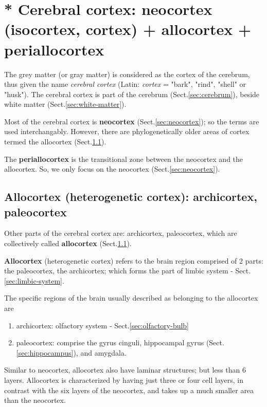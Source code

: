 \section{* Cerebral cortex: neocortex (isocortex, cortex) +
allocortex + periallocortex}
\label{sec:cerebral_cortex}
\label{sec:grey_matter}
\label{sec:periallocortex}

The grey matter (or gray matter) is considered as the cortex of the cerebrum,
thus given the name {\it cerebral cortex} (Latin: {\it cortex } = "bark",
"rind", "shell" or "husk"). The cerebral cortex is part of the cerebrum
(Sect.\ref{sec:cerebrum}), beside white matter (Sect.\ref{sec:white-matter}).

Most of the cerebral cortex is {\bf neocortex} (Sect.\ref{sec:neocortex}); so
the terms are used interchangably.  However, there are phylogenetically older
areas of cortex termed the allocortex (Sect.\ref{sec:allocortex}).

The {\bf periallocortex} is the transitional zone between the neocortex and the
allocortex. So, we only focus on the neocortex (Sect.\ref{sec:neocortex}).


\subsection{Allocortex (heterogenetic cortex): archicortex, paleocortex}
\label{sec:allocortex}

Other parts of the cerebral cortex are: archicortex,
paleocortex, which are collectively called {\bf allocortex}
(Sect.\ref{sec:allocortex}).

{\bf Allocortex} (heterogenetic cortex) refers to the brain region comprised of
2 parts: the paleocortex, the archicortex; which forms the part of limbic system
- Sect.\ref{sec:limbic-system}.

The specific regions of the brain usually described as belonging to the
allocortex are 
\begin{enumerate}
  \item  archicortex: olfactory system - Sect.\ref{sec:olfactory-bulb}
  
  \item paleocortex: comprise the gyrus cinguli, hippocampal gyrus
  (Sect.\ref{sec:hippocampus}), and amygdala.
\end{enumerate}


Similar to neocortex, allocortex also have laminar structures; but less than 6
layers. Allocortex is characterized by having just three or four cell layers, in
contrast with the six layers of the neocortex, and takes up a much smaller area
than the neocortex. 

